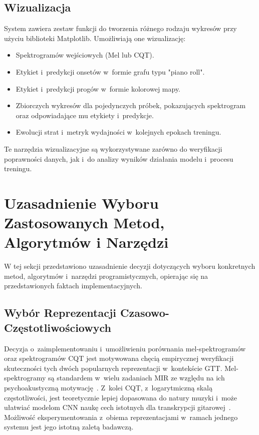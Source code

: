 \subsection{Wizualizacja}
\label{ssec:wizualizacja}

System zawiera zestaw funkcji do tworzenia różnego rodzaju wykresów przy użyciu biblioteki Matplotlib. Umożliwiają one wizualizację:
\begin{itemize}
    \item Spektrogramów wejściowych (Mel lub CQT).
    \item Etykiet i~predykcji onsetów w~formie grafu typu "piano roll".
    \item Etykiet i~predykcji progów w~formie kolorowej mapy.
    \item Zbiorczych wykresów dla pojedynczych próbek, pokazujących spektrogram oraz odpowiadające mu etykiety i~predykcje.
    \item Ewolucji strat i~metryk wydajności w~kolejnych epokach treningu.
\end{itemize}
Te narzędzia wizualizacyjne są wykorzystywane zarówno do weryfikacji poprawności danych, jak i~do analizy wyników działania modelu i~procesu treningu.

\section{Uzasadnienie Wyboru Zastosowanych Metod, Algorytmów i Narzędzi}
\label{sec:uzasadnienie_wyboru_metod_fakt}

W tej sekcji przedstawiono uzasadnienie decyzji dotyczących wyboru konkretnych metod, algorytmów i~narzędzi programistycznych, opierając się na przedstawionych faktach implementacyjnych.

\subsection{Wybór Reprezentacji Czasowo-Częstotliwościowych}
\label{ssec:uzasadnienie_reprezentacji_wybor_fakt}

Decyzja o~zaimplementowaniu i~umożliwieniu porównania mel-spektrogramów oraz spektrogramów CQT jest motywowana chęcią empirycznej weryfikacji skuteczności tych dwóch popularnych reprezentacji w~kontekście GTT. Mel-spektrogramy są standardem w~wielu zadaniach MIR ze względu na ich psychoakustyczną motywację~\autocite{Benetos2019AutomaticMusicTranscription, KlapuriDavy2006SignalProcessing}. Z~kolei CQT, z~logarytmiczną skalą częstotliwości, jest teoretycznie lepiej dopasowana do natury muzyki i~może ułatwiać modelom CNN naukę cech istotnych dla transkrypcji gitarowej~\autocite{Wiggins2019TabCNN, Zang2023SynthTab, KlapuriDavy2006SignalProcessing}. Możliwość eksperymentowania z~obiema reprezentacjami w~ramach jednego systemu jest jego istotną zaletą badawczą.

